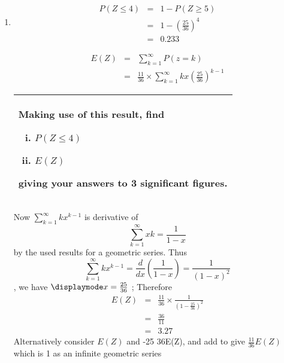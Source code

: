 \documentclass[a4paper,12pt]{article}
\begin{document}
\begin{enumerate}
    
     

    
    
\item 
\begin{eqnarray*}
P(Z \leq 4) &=& 1 - P(Z \geq 5) \\
&=& 1 - \left( \frac{25}{36} \right)^4 \\
&=&  0.233
\end{eqnarray*}


\begin{eqnarray*}
E(Z) &=& \sum^{\infty}_{k=1}P(z = k) \\ &=& \frac{11}{36} \times \sum^{\infty}_{k=1} k x 
\left(\frac{25}{36}\right)^{k-1}
\end{eqnarray*}
\newpage
  \begin{table}[ht!]
     \centering
     \begin{tabular}{|p{15cm}|}
     \hline  
     \large
 Making use of this result, find 
\begin{enumerate}[(i)]
    \item $P(Z \leq 4)$ 
    \item $E(Z)$
\end{enumerate}

giving your answers to 3 significant figures. 
 \\ \hline 
      \end{tabular}
    \end{table}
Now
$\sum^{\infty}_{k=1} k x ^{k-1}$ is derivative of
\[ \sum^{\infty}_{k=1} 
xk = \frac{1}{1-x} \]by the used results for a geometric series.
Thus
\[\sum^{\infty}_{k=1} k x ^{k-1} = \frac{d}{dx} \left( \frac{1}{1-x} \right) = \frac{1}{(1-x)^2} \], we have ${ \displaymode x = \frac{25}{36}}$ ;
Therefore
\begin{eqnarray*}
E(Z) &=& \frac{11}{36} \times \frac{1}{(1- \frac{25}{36})^2} \\ &=& \frac{36}{11} 
\\ &=& 3.27
\end{eqnarray*}
Alternatively consider $E(Z)$ and -25
36E(Z), and add to give $\frac{11}{36}E(Z)$ which is 1 as an
infinite geometric series
\end{enumerate}
\end{document}
